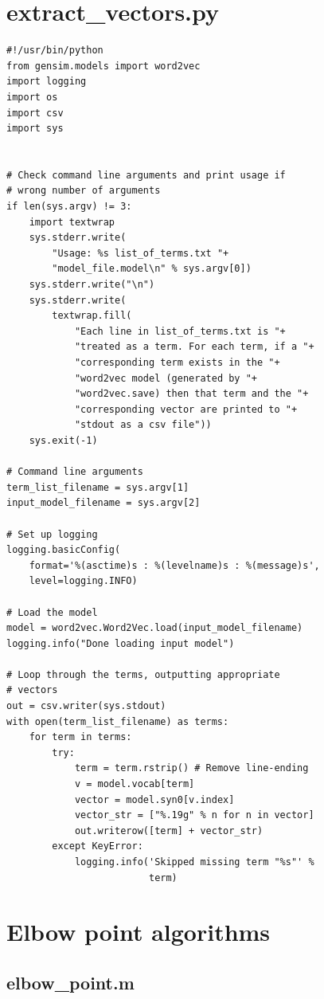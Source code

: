 \documentclass[10pt,letterpaper]{book}
\begin{document}
\section{extract\_vectors.py}
\label{app:extractvectors}
\lstset{language=Python}
\begin{lstlisting}
#!/usr/bin/python
from gensim.models import word2vec
import logging
import os
import csv
import sys


# Check command line arguments and print usage if
# wrong number of arguments
if len(sys.argv) != 3:
    import textwrap
    sys.stderr.write(
        "Usage: %s list_of_terms.txt "+
        "model_file.model\n" % sys.argv[0])
    sys.stderr.write("\n")
    sys.stderr.write(
        textwrap.fill(
            "Each line in list_of_terms.txt is "+
            "treated as a term. For each term, if a "+
            "corresponding term exists in the "+
            "word2vec model (generated by "+
            "word2vec.save) then that term and the "+
            "corresponding vector are printed to "+
            "stdout as a csv file"))
    sys.exit(-1)

# Command line arguments
term_list_filename = sys.argv[1]
input_model_filename = sys.argv[2]

# Set up logging
logging.basicConfig(
    format='%(asctime)s : %(levelname)s : %(message)s', 
    level=logging.INFO)

# Load the model
model = word2vec.Word2Vec.load(input_model_filename)
logging.info("Done loading input model")

# Loop through the terms, outputting appropriate
# vectors
out = csv.writer(sys.stdout)
with open(term_list_filename) as terms:
    for term in terms:
        try:
            term = term.rstrip() # Remove line-ending
            v = model.vocab[term]
            vector = model.syn0[v.index]
            vector_str = ["%.19g" % n for n in vector]
            out.writerow([term] + vector_str)
        except KeyError:
            logging.info('Skipped missing term "%s"' % 
                         term)
\end{lstlisting}


\section{Elbow point algorithms}
\label{app:elbow_point_algorithms}
\lstset{language=Matlab}

\subsection{elbow\_point.m}
\end{document}
